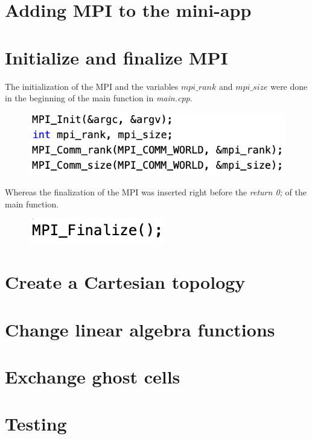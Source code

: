 \documentclass[unicode,11pt,a4paper,oneside,numbers=endperiod,openany]{scrartcl}
\begin{document}
\graphicspath{{./img/}}

\setassignment
{}

\newline

\section*{Adding MPI to the mini-app}

\section{Initialize and finalize MPI }

The initialization of the MPI and the variables $mpi\_rank$ and $mpi\_size$ were done in the beginning of the main function in \textit{main.cpp}.

\begin{figure}[H]
    \centering
    \includegraphics[width=.5\linewidth]{initialize}
\end{figure}

Whereas the finalization of the MPI was inserted right before the \textit{return 0;} of the main function.

\begin{figure}[H]
    \centering
    \includegraphics[width=.3\linewidth]{finalize}
\end{figure}

\section{Create a Cartesian topology }


\section{Change linear algebra functions }

\section{Exchange ghost cells }

\section{Testing }
\end{document}
